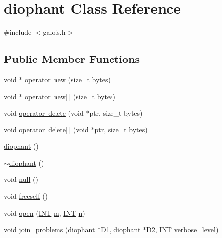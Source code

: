 \hypertarget{classdiophant}{}\section{diophant Class Reference}
\label{classdiophant}


{\ttfamily \#include $<$galois.\+h$>$}

\subsection*{Public Member Functions}
\begin{DoxyCompactItemize}
\item 
void $\ast$ \mbox{\hyperlink{classdiophant_a1c424e5e00210e8a0ea70f2a6ef3ae80}{operator new}} (size\+\_\+t bytes)
\item 
void $\ast$ \mbox{\hyperlink{classdiophant_afe37c0efebaf060801b6298f0b0cca73}{operator new\mbox{[}$\,$\mbox{]}}} (size\+\_\+t bytes)
\item 
void \mbox{\hyperlink{classdiophant_a72256fe11d78fb61d92311defa781e55}{operator delete}} (void $\ast$ptr, size\+\_\+t bytes)
\item 
void \mbox{\hyperlink{classdiophant_a7171fe9f11c2fe28f69da560c420bd25}{operator delete\mbox{[}$\,$\mbox{]}}} (void $\ast$ptr, size\+\_\+t bytes)
\item 
\mbox{\hyperlink{classdiophant_ae898c535557b30104376ebfb186b8c31}{diophant}} ()
\item 
\mbox{\hyperlink{classdiophant_a2ab3304795de1097fe60e6e8b2145466}{$\sim$diophant}} ()
\item 
void \mbox{\hyperlink{classdiophant_a9437e7af60e3eb88106619e585a0caed}{null}} ()
\item 
void \mbox{\hyperlink{classdiophant_a824e8dadc8420254d9e91f54e7e0ff5d}{freeself}} ()
\item 
void \mbox{\hyperlink{classdiophant_a182e2928400c2e7fc01f4155cec72b57}{open}} (\mbox{\hyperlink{galois_8h_a09fddde158a3a20bd2dcadb609de11dc}{I\+NT}} \mbox{\hyperlink{classdiophant_aa69645f9f75b13d51a58bdda260d9d50}{m}}, \mbox{\hyperlink{galois_8h_a09fddde158a3a20bd2dcadb609de11dc}{I\+NT}} \mbox{\hyperlink{classdiophant_a2dbedb80b802fc1539d8d64657dd2c38}{n}})
\item 
void \mbox{\hyperlink{classdiophant_a6753173ea1ad81280ce91efe6a089102}{join\+\_\+problems}} (\mbox{\hyperlink{classdiophant}{diophant}} $\ast$D1, \mbox{\hyperlink{classdiophant}{diophant}} $\ast$D2, \mbox{\hyperlink{galois_8h_a09fddde158a3a20bd2dcadb609de11dc}{I\+NT}} \mbox{\hyperlink{simeon_8_c_a818073fbcc2f439e7c56952f67386122}{verbose\+\_\+level}})

\end{DoxyCompactItemize}
